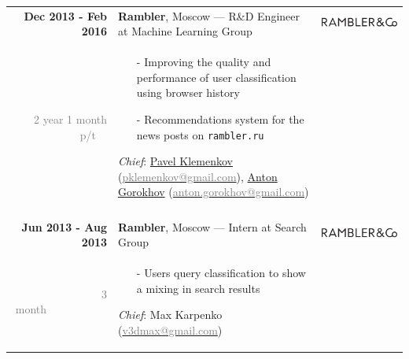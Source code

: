 \documentclass[a4paper,10pt]{article} %
\begin{document}
\begin{tabular}{r|p{11.5cm}c}
\textbf{Dec 2013 - Feb 2016} &  
\textbf{Rambler}, Moscow --- R\&D Engineer at Machine Learning Group  &
\multirow{1}{*}{\includegraphics[scale=0.1]{img/ramblerco}}\\ 
\textcolor{gray}{2 year 1 month p/t}~~ &  \footnotesize{
  \vspace{-0.25cm}
  \begin{itemize}
      \item[-] Improving the quality and performance of user classification using browser history
  	  \item[-] Recommendations system for the news posts on \texttt{rambler.ru}
  \end{itemize}
	\scriptsize{
	\emph{Chief}:  
	\href{https://ru.linkedin.com/in/pavel-klemenkov-7a88a956}{Pavel Klemenkov} 
	(\href{mailto:pklemenkov@gmail.com}{\textcolor{gray}{pklemenkov@gmail.com}}),
	\href{https://ru.linkedin.com/in/anton-gorokhov-2959482}{Anton Gorokhov}
	(\href{mailto:anton.gorokhov@gmail.com}{\textcolor{gray}{anton.gorokhov@gmail.com}})}
  \vspace{-0.1cm}
} & 
\\
\multicolumn{2}{c}{}\\

\textbf{Jun 2013 - Aug 2013} & 
\textbf{Rambler}, Moscow --- Intern at Search Group&
\multirow{1}{*}{\includegraphics[scale=0.1]{img/ramblerco}}\\ 
\textcolor{gray}{3 month}~~~~~~~~~~~& 
\footnotesize{

\vspace{-0.25cm}
\begin{itemize}
	\item[-] Users query classification to show a mixing in search results
\end{itemize}
\scriptsize{
	\emph{Chief}:  
Max Karpenko
(\href{mailto:v3dmax@gmail.com}{\textcolor{gray}{v3dmax@gmail.com}})}
\vspace{-0.1cm}
}& 
\\
\end{tabular}
\end{document}
